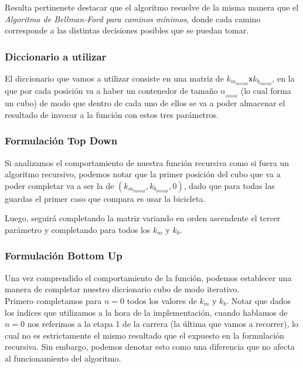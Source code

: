 Resulta pertinenete destacar que el algoritmo resuelve de la misma manera que el \emph{Algoritmo de Bellman-Ford para caminos mínimos}, donde cada camino corresponde a las distintas decisiones posibles que se puedan tomar.

\subsubsection*{Diccionario a utilizar}

El diccionario que vamos a utilizar consiste en una matriz de $k_{m_{inicial}}$\texttt{x}$k_{b_{inicial}}$, en la que por cada posici\'on va a haber un contenedor de tama\~no $n_{_{inicial}}$ (lo cual forma un cubo) de modo que dentro de cada uno de ellos se va a poder almacenar el resultado de invocar a la funci\'on con estos tres par\'ametros.

\subsubsection*{Formulaci\'on Top Down}


Si analizamos el comportamiento de nuestra funci\'on recursiva como si fuera un algoritmo recursivo, podemos notar que la primer posici\'on del cubo que va a poder completar va a ser la de $(k_{m_{inicial}},k_{b_{inicial}},0)$, dado que para todas las guardas el primer caso que compara es usar la bicicleta. 

Luego, seguir\'a completando la matriz variando en orden ascendente el tercer par\'ametro y completando para todos los $k_m$ y $k_b$.

\subsubsection*{Formulaci\'on Bottom Up}

Una vez comprendido el comportamiento de la funci\'on, podemos establecer una manera de completar nuestro diccionario cubo de modo iterativo.\\

Primero completamos para $n=0$ todos los valores de $k_m$ y $k_b$. Notar que dados los \'indices que utilizamos a la hora de la implementaci\'on, cuando hablamos de $n=0$ nos referimos a la etapa 1 de la carrera (la \'ultima que vamos a recorrer), lo cual no es estrictamente el mismo resultado que el expuesto en la formulaci\'on recursiva. Sin embargo, podemos denotar esto como una diferencia que no afecta al funcionamiento del algoritmo.

